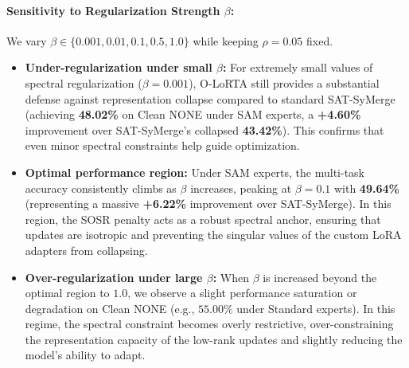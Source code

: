\documentclass{article}
\theoremstyle{plain}
\theoremstyle{definition}
\theoremstyle{remark}
\begin{document}
\paragraph{Sensitivity to Regularization Strength $\beta$:}
We vary $\beta \in \{0.001, 0.01, 0.1, 0.5, 1.0\}$ while keeping $\rho = 0.05$ fixed.
\begin{itemize}
    \item \textbf{Under-regularization under small $\beta$:} For extremely small values of spectral regularization ($\beta = 0.001$), O-LoRTA still provides a substantial defense against representation collapse compared to standard SAT-SyMerge (achieving \textbf{48.02\%} on Clean NONE under SAM experts, a \textbf{+4.60\%} improvement over SAT-SyMerge's collapsed \textbf{43.42\%}). This confirms that even minor spectral constraints help guide optimization.
    \item \textbf{Optimal performance region:} Under SAM experts, the multi-task accuracy consistently climbs as $\beta$ increases, peaking at $\beta = 0.1$ with \textbf{49.64\%} (representing a massive \textbf{+6.22\%} improvement over SAT-SyMerge). In this region, the SOSR penalty acts as a robust spectral anchor, ensuring that updates are isotropic and preventing the singular values of the custom LoRA adapters from collapsing.
    \item \textbf{Over-regularization under large $\beta$:} When $\beta$ is increased beyond the optimal region to $1.0$, we observe a slight performance saturation or degradation on Clean NONE (e.g., $55.00\%$ under Standard experts). In this regime, the spectral constraint becomes overly restrictive, over-constraining the representation capacity of the low-rank updates and slightly reducing the model's ability to adapt.
\end{itemize}
\end{document}
